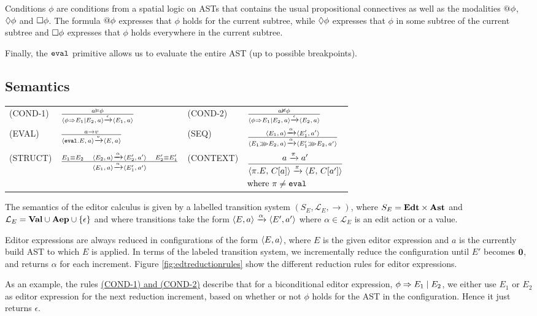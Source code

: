 Conditions $\phi$ are conditions from a spatial logic on ASTs that contains
the usual propositional connectives as well as the modalities
$@\phi$, $\Diamond \phi$ and $\Box \phi$. The formula
$@\phi$ expresses that $\phi$ holds for the current subtree, while
$\Diamond \phi$ expresses that $\phi$ in some subtree of the current
subtree and $\Box \phi$ expresses that $\phi$ holds
everywhere in the current subtree.

Finally, the $\texttt{eval}$ primitive allows us to evaluate the entire AST
(up to possible breakpoints).

\subsection{Semantics}

\begin{figure*}
  \center
  \renewcommand{\arraystretch}{2}
  \begin{tabular}{llll}
    \scriptsize(COND-1)  & $ \frac{a \vDash \phi} {\langle \phi \Rightarrow E_1 \mid E_2,\, a \rangle\xrightarrow[]{\text{$\epsilon$}}\langle E_1,\, a \rangle} $           & \scriptsize(COND-2) & $ \frac{a \nvDash \phi} {\langle \phi \Rightarrow E_1 \mid E_2,\, a \rangle\xrightarrow[]{\text{$\epsilon$}}\langle E_2,\, a \rangle}$ \\
    \scriptsize(EVAL)    & $ \frac{a \to v} {\langle \texttt{eval}.E,\, a \rangle\xrightarrow[]{\text{$v$}}\langle E,\, a \rangle} $              & \scriptsize(SEQ)    & $ \frac{\langle E_1,\, a \rangle\xrightarrow[]{\text{$\alpha$}}\langle E_1',\, a' \rangle} {\langle E_1 \ggg E_2,\, a \rangle\xrightarrow[]{\text{$\alpha$}}\langle E_1' \ggg E_2,\, a' \rangle}$     \\
    \scriptsize(STRUCT)  & $\frac{E_1 \equiv E_2\quad\langle E_2,\, a \rangle\xrightarrow[]{\text{$\alpha$}}\langle E_2',\, a' \rangle \quad E_2' \equiv E_1'} {\langle E_1,\, a \rangle\xrightarrow[]{\text{$\alpha$}}\langle E_1',\, a' \rangle}$              & \scriptsize(CONTEXT)& \scriptsize$\begin{aligned} & \frac{a \xrightarrow[]{\text{$\pi$}} a'} {\langle \pi.E,\, C[a] \rangle\xrightarrow[]{\text{$\pi$}}\langle E,\, C[a'] \rangle} \\ & \text{where } \pi \neq \texttt{eval} \end{aligned}$
  \end{tabular}
  \caption{Editor Expression reduction rules}
  \label{fig:edtreductionrules}
\end{figure*}

The semantics of the editor calculus is given by a labelled transition system
$(S_E, \mathcal{L}_E, \to)$, where $S_E = \textbf{Edt} \times \textbf{Ast}$ and $\mathcal{L}_E
= \textbf{Val} \cup \textbf{Aep} \cup \{\epsilon\}$ and where transitions take the form
$\langle E, a \rangle \xrightarrow[]{\text{$\alpha$}} \langle E', a' \rangle$ where
$\alpha \in \mathcal{L}_E$ is an edit action or a value.

Editor expressions are always reduced in configurations of the form
$\langle E,a \rangle$, where $E$ is the given editor expression and $a$ is the
currently build AST to which $E$ is applied. In terms of the labeled
transition system, we incrementally reduce the configuration until $E'$ becomes
$\mathbf{0}$, and returns $\alpha$ for each increment. Figure
\ref{fig:edtreductionrules} show the different reduction rules for editor
expressions.

As an example, the rules \hyperref[fig:edtreductionrules]{(COND-1) and (COND-2)} describe that
for a biconditional editor expression, $\phi \Rightarrow E_1 \mid E_2$, we either use
$E_1$ or $E_2$ as editor expression for the next reduction increment, based on
whether or not $\phi$ holds for the AST in the configuration. Hence it just
returns $\epsilon$.

